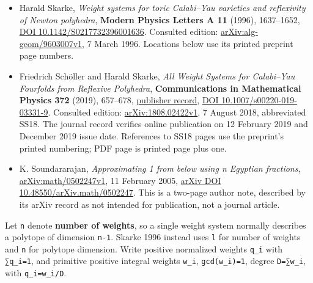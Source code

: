 \documentclass[11pt,a4paper,oneside]{report}
\providecommand{\tightlist}{%
  \setlength{\itemsep}{0pt}\setlength{\parskip}{0pt}}
\begin{document}
\begin{itemize}
\tightlist
\item
  Harald Skarke, \emph{Weight systems for toric Calabi--Yau varieties
  and reflexivity of Newton polyhedra}, \textbf{Modern Physics Letters A
  11} (1996), 1637--1652,
  \href{https://doi.org/10.1142/S0217732396001636}{DOI
  10.\allowbreak{}1142/\allowbreak{}S0217732\allowbreak{}39600163\allowbreak{}6}.
  Consulted edition:
  \href{https://arxiv.org/abs/alg-geom/9603007v1}{arXiv:\allowbreak{}alg-\allowbreak{}geom/\allowbreak{}9603007v\allowbreak{}1},
  7 March 1996. Locations below use its printed preprint page numbers.
\item
  Friedrich Schöller and Harald Skarke, \emph{All Weight Systems for
  Calabi--Yau Fourfolds from Reflexive Polyhedra},
  \textbf{Communications in Mathematical Physics 372} (2019), 657--678,
  \href{https://link.springer.com/article/10.1007/s00220-019-03331-9}{publisher
  record}, \href{https://doi.org/10.1007/s00220-019-03331-9}{DOI
  10.\allowbreak{}1007/\allowbreak{}s00220-\allowbreak{}019-\allowbreak{}03331-\allowbreak{}9}.
  Consulted edition:
  \href{https://arxiv.org/abs/1808.02422v1}{arXiv:\allowbreak{}1808.\allowbreak{}02422v1},
  7 August 2018, abbreviated SS18. The journal record verifies online
  publication on 12 February 2019 and December 2019 issue date.
  References to SS18 pages use the preprint's printed numbering; PDF
  page is printed page plus one.
\item
  K. Soundararajan, \emph{Approximating 1 from below using n Egyptian
  fractions},
  \href{https://arxiv.org/abs/math/0502247v1}{arXiv:\allowbreak{}math/\allowbreak{}0502247v\allowbreak{}1},
  11 February 2005,
  \href{https://doi.org/10.48550/arXiv.math/0502247}{arXiv DOI
  10.\allowbreak{}48550/\allowbreak{}arXiv.\allowbreak{}math/\allowbreak{}0502247}.
  This is a two-page author note, described by its arXiv record as not
  intended for publication, not a journal article.
\end{itemize}

Let \texttt{n} denote \textbf{number of weights}, so a single weight
system normally describes a polytope of dimension
\texttt{n-\allowbreak{}1}. Skarke 1996 instead uses \texttt{l} for
number of weights and \texttt{n} for polytope dimension. Write positive
normalized weights \texttt{q\_\allowbreak{}i} with
\texttt{∑q\_\allowbreak{}i=\allowbreak{}1}, and primitive positive
integral weights \texttt{w\_\allowbreak{}i},
\texttt{gcd(\allowbreak{}w\_\allowbreak{}i)\allowbreak{}=\allowbreak{}1},
degree \texttt{D=\allowbreak{}∑w\_\allowbreak{}i}, with
\texttt{q\_\allowbreak{}i=\allowbreak{}w\_\allowbreak{}i/\allowbreak{}D}.
\end{document}
